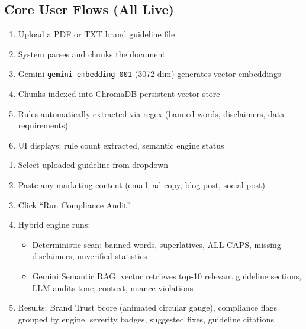 \documentclass[11pt,a4paper]{article}
\begin{document}
\subsection{Core User Flows (All Live)}

\begin{tcolorbox}[colback=lightgray, colframe=primaryblue, arc=2mm, boxrule=0.5pt, title=\textbf{Flow 1: Brand Guideline Upload (/upload)}]
\begin{enumerate}[nosep]
    \item Upload a PDF or TXT brand guideline file
    \item System parses and chunks the document
    \item Gemini \texttt{gemini-embedding-001} (3072-dim) generates vector embeddings
    \item Chunks indexed into ChromaDB persistent vector store
    \item Rules automatically extracted via regex (banned words, disclaimers, data requirements)
    \item UI displays: rule count extracted, semantic engine status
\end{enumerate}
\end{tcolorbox}

\vspace{0.5cm}

\begin{tcolorbox}[colback=lightgray, colframe=primaryblue, arc=2mm, boxrule=0.5pt, title=\textbf{Flow 2: Content Audit (/submit)}]
\begin{enumerate}[nosep]
    \item Select uploaded guideline from dropdown
    \item Paste any marketing content (email, ad copy, blog post, social post)
    \item Click ``Run Compliance Audit''
    \item Hybrid engine runs:
    \begin{itemize}[nosep]
        \item Deterministic scan: banned words, superlatives, ALL CAPS, missing disclaimers, unverified statistics
        \item Gemini Semantic RAG: vector retrieves top-10 relevant guideline sections, LLM audits tone, context, nuance violations
    \end{itemize}
    \item Results: Brand Trust Score (animated circular gauge), compliance flags grouped by engine, severity badges, suggested fixes, guideline citations
\end{enumerate}
\end{tcolorbox}
\end{document}
